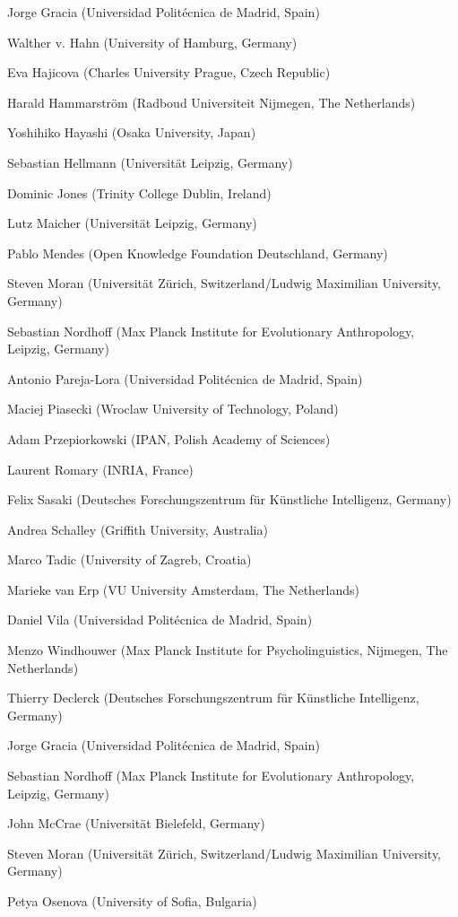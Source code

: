 \documentclass[11pt]{article}
\begin{document}
\begin{figure*}[t]
\begin{minipage}{\textwidth}
{	Jorge Gracia (Universidad Politécnica de Madrid, Spain)

	Walther v. Hahn (University of Hamburg, Germany)

	Eva Hajicova (Charles University Prague, Czech Republic)

	Harald Hammarström (Radboud Universiteit Nijmegen, The Netherlands)

	Yoshihiko Hayashi (Osaka University, Japan)

	Sebastian Hellmann (Universität Leipzig, Germany)

	Dominic Jones (Trinity College Dublin, Ireland)

	Lutz Maicher (Universität Leipzig, Germany)

	Pablo Mendes (Open Knowledge Foundation Deutschland, Germany)

	Steven Moran (Universität Zürich, Switzerland/Ludwig Maximilian University, Germany)

	Sebastian Nordhoff (Max Planck Institute for Evolutionary Anthropology, Leipzig, Germany)

	Antonio Pareja-Lora (Universidad Politécnica de Madrid, Spain)

	Maciej Piasecki (Wroclaw University of Technology, Poland)

	Adam Przepiorkowski (IPAN, Polish Academy of Sciences)

	Laurent Romary (INRIA, France)

	Felix Sasaki (Deutsches Forschungszentrum für Künstliche Intelligenz, Germany)

	Andrea Schalley (Griffith University, Australia)

	Marco Tadic (University of Zagreb, Croatia)

	Marieke van Erp (VU University Amsterdam, The Netherlands)

	Daniel Vila (Universidad Politécnica de Madrid, Spain)

	Menzo Windhouwer (Max Planck Institute for Psycholinguistics, Nijmegen, The Netherlands)

	Thierry Declerck (Deutsches Forschungszentrum für Künstliche Intelligenz, Germany)

	Jorge Gracia (Universidad Politécnica de Madrid, Spain)

	Sebastian Nordhoff (Max Planck Institute for Evolutionary Anthropology, Leipzig, Germany)

	John McCrae (Universität Bielefeld, Germany)
	 
	Steven Moran (Universität Zürich, Switzerland/Ludwig Maximilian University, Germany)
	 
	Petya Osenova (University of Sofia, Bulgaria)
}
	
\end{minipage}
\end{figure*}
\pagebreak
\end{document}
